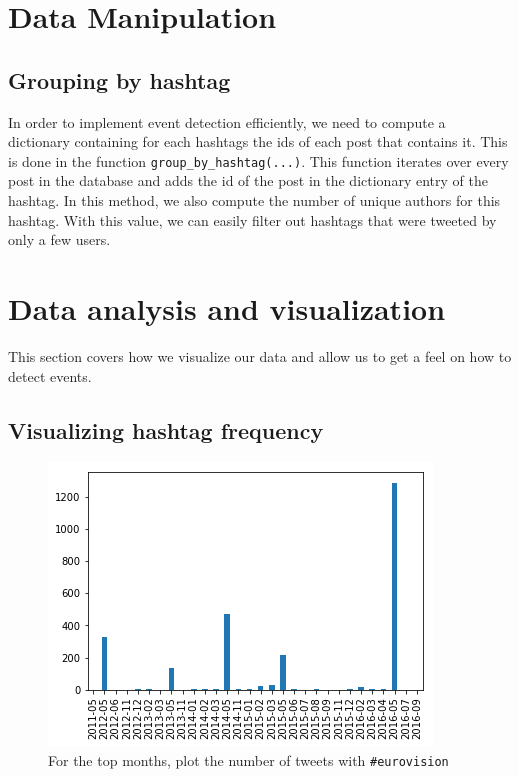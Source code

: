 \documentclass[11pt]{article}
\begin{document}
\section{Data Manipulation}


\subsection{Grouping by hashtag}

In order to implement event detection efficiently, we need to compute a dictionary containing for each hashtags the ids of each post that contains it. This is done in the function \texttt{group\_by\_hashtag(...)}. This function iterates over every post in the database and adds the id of the post in the dictionary entry of the hashtag. In this method, we also compute the number of unique authors for this hashtag. With this value, we can easily filter out hashtags that were tweeted by only a few users.


\section{Data analysis and visualization}

This section covers how we visualize our data and allow us to get a feel on how to detect events.

\subsection{Visualizing hashtag frequency}

\begin{figure}[htbp]
  \vspace*{-1mm}
  \centering
  \includegraphics[width=\columnwidth]{figures/freq_month_eurovision.png}
  \vspace{-5mm}
  \caption{For the top months, plot the number of tweets with  \texttt{\#eurovision}}
  \label{fig:freq_month_eurovision}
\end{figure}
\end{document}
